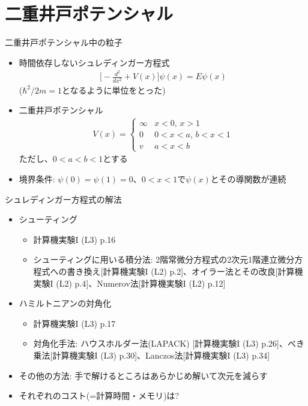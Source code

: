 \section{二重井戸ポテンシャル}

\begin{frame}[t,fragile]{二重井戸ポテンシャル中の粒子}
  \begin{itemize}
  \item 時間依存しないシュレディンガー方程式
    \begin{align*}
      \big[ -\frac{d^2}{dx^2} + V(x) \big] \psi(x) = E \psi(x)
    \end{align*}
    ($\hbar^2/2m = 1$となるように単位をとった)
  \item 二重井戸ポテンシャル
    \begin{align*}
      V(x) = \begin{cases}
        \infty & \text{$x < 0$, $x > 1$} \\
        0 & \text{$0 < x < a$, $b < x < 1$} \\
        v & \text{$a < x < b$}
      \end{cases}
    \end{align*}
    ただし、$0<a<b<1$とする
  \item 境界条件: $\psi(0) = \psi(1) = 0$、$0 < x < 1$で$\psi(x)$とその導関数が連続
  \end{itemize}
\end{frame}

\begin{frame}[t,fragile]{シュレディンガー方程式の解法}
  \begin{itemize}
  \item シューティング
    \begin{itemize}
    \item 計算機実験I (L3) p.16
    \item シューティングに用いる積分法: 2階常微分方程式の2次元1階連立微分方程式への書き換え[計算機実験I (L2) p.2]、オイラー法とその改良[計算機実験I (L2) p.4]、Numerov法[計算機実験I (L2) p.12]
    \end{itemize}
  \item ハミルトニアンの対角化
    \begin{itemize}
    \item 計算機実験I (L3) p.17
    \item 対角化手法: ハウスホルダー法(LAPACK) [計算機実験I (L3) p.26]、べき乗法[計算機実験I (L3) p.30]、Lanczos法[計算機実験I (L3) p.34]
    \end{itemize}
  \item その他の方法: 手で解けるところはあらかじめ解いて次元を減らす
  \item それぞれのコスト(=計算時間・メモリ)は?
  \end{itemize}
\end{frame}
